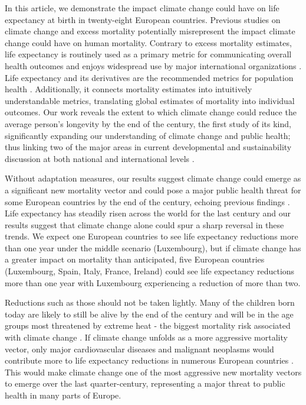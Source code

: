 \documentclass[12pt,]{article}
\begin{document}
In this article, we demonstrate the impact climate change could have on
life expectancy at birth in twenty-eight European countries. Previous
studies on climate change and excess mortality potentially misrepresent
the impact climate change could have on human mortality. Contrary to
excess mortality estimates, life expectancy is routinely used as a
primary metric for communicating overall health outcomes and enjoys
widespread use by major international organizations
\citep{world2015world, marmot2012building, salomon2012healthy}. Life
expectancy and its derivatives are the recommended metrics for
population health \citep{parrish2010peer}. Additionally, it connects
mortality estimates into intuitively understandable metrics, translating
global estimates of mortality into individual outcomes. Our work reveals
the extent to which climate change could reduce the average person's
longevity by the end of the century, the first study of its kind,
significantly expanding our understanding of climate change and public
health; thus linking two of the major areas in current developmental and
sustainability discussion at both national and international levels
\citep{abel2016meeting}.

Without adaptation measures, our results suggest climate change could
emerge as a significant new mortality vector and could pose a major
public health threat for some European countries by the end of the
century, echoing previous findings
\citep{forzieri2017increasing, patz2005impact}. Life expectancy has
steadily risen across the world for the last century
\citep{oeppen2002broken} and our results suggest that climate change
alone could spur a sharp reversal in these trends. We expect one
European countries to see life expectancy reductions more than one year
under the middle scenario (Luxembourg), but if climate change has a
greater impact on mortality than anticipated, five European countries
(Luxembourg, Spain, Italy, France, Ireland) could see life expectancy
reductions more than one year with Luxembourg experiencing a reduction
of more than two.

Reductions such as those should not be taken lightly. Many of the
children born today are likely to still be alive by the end of the
century and will be in the age groups most threatened by extreme heat -
the biggest mortality risk associated with climate change
\citep{keatinge2000heat}. If climate change unfolds as a more aggressive
mortality vector, only major cardiovascular diseases and malignant
neoplasms would contribute more to life expectancy reductions in
numerous European countries \citep{arias2013united}. This would make
climate change one of the most aggressive new mortality vectors to
emerge over the last quarter-century, representing a major threat to
public health in many parts of Europe.
\end{document}
